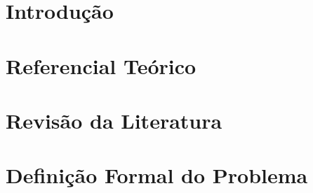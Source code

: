 \documentclass[a4paper,12pt,oneside,openany]{book}
\begin{document}
\frontmatter
\thispagestyle{empty}



\pagebreak



\tableofcontents

\listoffigures

\listoftables

\mainmatter
\cleardoublepage

\chapter{Introdu\c{c}\~ao}
\label{cap:introducao}


\chapter{Referencial Te\'orico}
\label{cap:revisao}


\chapter{Revis\~ao da Literatura}
\label{cap:revisao_lit}


\chapter{Defini\c{c}\~ao Formal do Problema}
\label{cap:modelagem}


\end{document}
